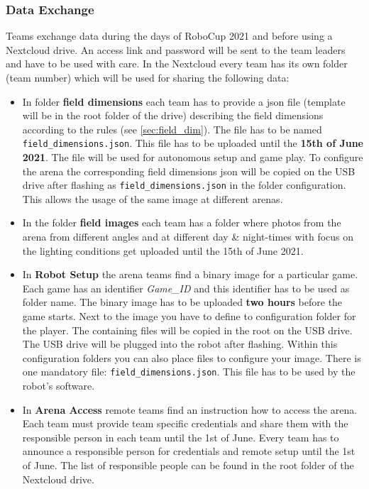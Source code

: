 \subsubsection{Data Exchange}
\label{sec:data_exchange}
Teams exchange data during the days of RoboCup 2021 and before using a Nextcloud drive. An access link and password will be sent to the team leaders and have to be used with care. In the Nextcloud every team has its own folder (team number) which will be used for sharing the following data:

\begin{itemize}
    \item In folder \textbf{field dimensions} each team has to provide a json file (template will be in the root folder of the drive) describing the field dimensions according to the rules (see \ref{sec:field_dim}). The file has to be named \texttt{field\_dimensions.json}. This file has to be uploaded until the \textbf{15th of June 2021}. The file will be used for autonomous setup and game play. To configure the arena the corresponding field dimensions json will be copied on the USB drive after flashing as \texttt{field\_dimensions.json} in the folder configuration. This allows the usage of the same image at different arenas.
    \item  In the folder \textbf{field images} each team has a folder where photos from the arena from different angles and at different day \& night-times with focus on the lighting conditions get uploaded until the 15th of June 2021.
    \item In \textbf{Robot Setup} the arena teams find a binary image for a particular game. Each game has an identifier \textit{Game\_ID} and this identifier has to be used as folder name. The binary image has to be uploaded \textbf{two hours} before the game starts. Next to the image you have to define to configuration folder for the player. The containing files will be copied in the root on the USB drive. The USB drive will be plugged into the robot after flashing. Within this configuration folders you can also place files to configure your image. There is one mandatory file: \texttt{field\_dimensions.json}. This file has to be used by the robot's software.
    \item In \textbf{Arena Access} remote teams find an instruction how to access the arena. Each team must provide team specific credentials and share them with the responsible person in each team until the 1st of June. Every team has to announce a responsible person for credentials and remote setup until the 1st of June. The list of responsible people can be found in the root folder of the Nextcloud drive.

\end{itemize}
